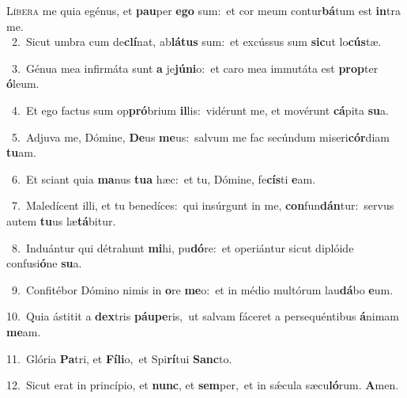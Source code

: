 \lettrine{\initial\textcolor{\initialcolor}{L}}{íbera} me quia egénus, et \textbf{pau}\-per \textbf{e}\-\textbf{go} sum:~\star et cor meum contur\-\textbf{bá}\-tum est \textbf{in}\-tra me.\\
{\numbfont\textcolor{\numbcolor}{~2.}}~Sicut umbra cum de\-\textbf{clí}\-nat, ab\-\textbf{lá}\-\textbf{tus} sum:~\star et excússus sum \textbf{sic}\-ut lo\-\textbf{cús}\-tæ.\par
{\numbfont\textcolor{\numbcolor}{~3.}}~Génua mea infirmáta sunt \textbf{a} je\-\textbf{jú}\-\textbf{ni}o:~\star et caro mea immutáta est \textbf{prop}\-ter \textbf{ó}\-leum.\par
{\numbfont\textcolor{\numbcolor}{~4.}}~Et ego factus sum op\-\textbf{pró}\-brium \textbf{il}\-lis:~\star vidérunt me, et movérunt \textbf{cá}\-pita \textbf{su}\-a.\par
{\numbfont\textcolor{\numbcolor}{~5.}}~Adjuva me, Dómine, \textbf{De}\-us \textbf{me}\-us:~\star salvum me fac secúndum miseri\-\textbf{cór}\-diam \textbf{tu}\-am.\par
{\numbfont\textcolor{\numbcolor}{~6.}}~Et sciant quia \textbf{ma}\-nus \textbf{tu}\-\textbf{a} hæc:~\star et tu, Dómine, fe\-\textbf{cís}\-ti \textbf{e}\-am.\par
{\numbfont\textcolor{\numbcolor}{~7.}}~Maledícent illi, et tu benedíces:~\dagger qui insúrgunt in me, \textbf{con}\-fun\-\textbf{dán}\-tur:~\star servus autem \textbf{tu}\-us læ\-\textbf{tá}\-bitur.\par
{\numbfont\textcolor{\numbcolor}{~8.}}~Induántur qui détrahunt \textbf{mi}\-hi, pu\-\textbf{dó}\-re:~\star et operiántur sicut diplóide confusi\-\textbf{ó}\-ne \textbf{su}\-a.\par
{\numbfont\textcolor{\numbcolor}{~9.}}~Confitébor Dómino nimis in \textbf{o}\-re \textbf{me}\-o:~\star et in médio multórum lau\-\textbf{dá}\-bo \textbf{e}\-um.\par
{\numbfont\textcolor{\numbcolor}{10.}}~Quia ástitit a \textbf{dex}\-tris \textbf{páu}\-\textbf{pe}ris,~\star ut salvam fáceret a persequéntibus \textbf{á}\-nimam \textbf{me}\-am.\par
{\numbfont\textcolor{\numbcolor}{11.}}~Glória \textbf{Pa}\-tri, et \textbf{Fí}\-\textbf{li}o,~\star et Spi\-\textbf{rí}\-tui \textbf{Sanc}\-to.\par
{\numbfont\textcolor{\numbcolor}{12.}}~Sicut erat in princípio, et \textbf{nunc}\-, et \textbf{sem}\-per,~\star et in sǽcula sæcu\-\textbf{ló}\-rum. \textbf{A}\-men.\par
